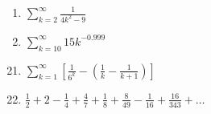 \documentclass[12pt]{article}
\newif\ifans
\begin{document}
\begin{enumerate}
\item $\sum_{k=2}^{\infty}{\frac{1}{4k^2-9}}$

\ifans{\fbox{The series converges by the Integral Test.; Detailed Solution: \textcolor{blue}{\href{http://www.math.drexel.edu/classes/Calculus/resources/Math123HW/Solutions/123_08_Convergence_Tests_19.pdf}{Here}}}} \fi

\item $\sum_{k=10}^{\infty}{15k^{-0.999}}$

\ifans{\fbox{The series is a constant multiple of a $p$-series with $p=0.999<1$, so the series diverges.}} \fi

\end{enumerate}


\begin{enumerate}
\setcounter{enumi}{20}

\item $\sum_{k=1}^{\infty}{\left[\frac{1}{6^k}-\left(\frac{1}{k}-\frac{1}{k+1}\right)\right]   }$

\ifans{\fbox{$-\frac{4}{5}$ }} \fi

\item $\frac{1}{2}+2-\frac{1}{4}+\frac{4}{7}+\frac{1}{8}+\frac{8}{49}-\frac{1}{16}+\frac{16}{343}+\ldots$  \newline  {}

\ifans{\fbox{$\frac{47}{15}$ }} \fi

\end{enumerate}
\end{document}
